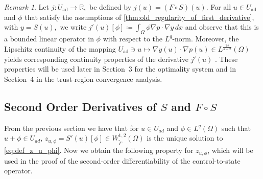 \documentclass[11pt]{article}
\newcommand{\feas}{U_{\textrm{ad}}}
\theoremstyle{definition}
\theoremstyle{remark}
\newtheorem{remark}[theorem]{Remark}
\begin{document}
\begin{remark}\label{rem:jprime}  Let $
j:\feas \to \mathbb{R},$ be defined by  $j(u) = (F \circ S) (u).$ 
	For all $u \in \feas$ and $\phi$ that satisfy the assumptions of \cref{thm:old_regularity_of_first_derivative}, with $y = S(u),$ we write $ j'(u)[\phi] \coloneqq \int_{\Omega} \phi \nabla p \cdot \nabla y\,dx $
	and observe that this is a bounded linear operator in $\phi$ with respect to the $L^q$-norm.  Moreover, the Lipschitz continuity of the mapping
$
\feas\ni u
\mapsto
\nabla y(u)\cdot \nabla p(u)
\in L^{\frac{2s}{s+2}}(\Omega)
$
yields corresponding continuity properties of the derivative
$j'(u)$ . These properties
will be used later in Section~3 for the optimality system and in
Section~4 in the trust-region convergence analysis.
\end{remark}
%


\subsection{Second Order Derivatives of \texorpdfstring{$S$}{S} and \texorpdfstring{$F \circ S$}{F o S}} 

From the previous section we have that for  $u \in U_{ad}$ and $\phi \in L^q(\Omega)$ such that $u+\phi \in U_{ad}$, $z_{u, \phi} = S'(u)[\phi] \in W^{1,2}_{\tilde\Gamma}(\Omega)$ is the unique solution to \eqref{eq:def_z_u_phi}. Now we obtain the following property for $z_{u, \phi}$, which will be used in the proof of the second-order
differentiability of the control-to-state operator. 
%
\end{document}
